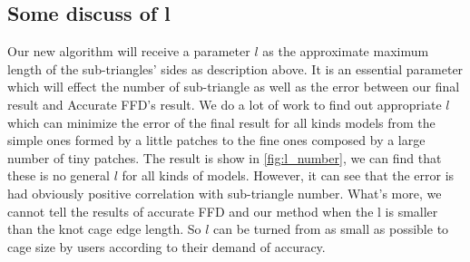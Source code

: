 \documentclass[3p]{elsarticle}
\begin{document}
\subsection{Some discuss of l}
Our new algorithm will receive a parameter $l$ as the approximate maximum length of the sub-triangles' sides as description above. It is an essential parameter which will effect the number of sub-triangle as well as the error between our final result and Accurate FFD's result. We do a lot of work to find out appropriate $l$ which can minimize the error of the final result for all kinds models from the simple ones formed by a little patches to the fine ones composed by a large number of tiny patches. The result is show in \ref{fig:l_number}, we can find that these is no general $l$ for all kinds of models. However, it can see that the error is had obviously positive correlation with sub-triangle number. What's more, we cannot tell the results of accurate FFD and our method when the l is smaller than the knot cage edge length. So $l$ can be turned from as small as possible to cage size by users according to their demand of accuracy.
\end{document}
